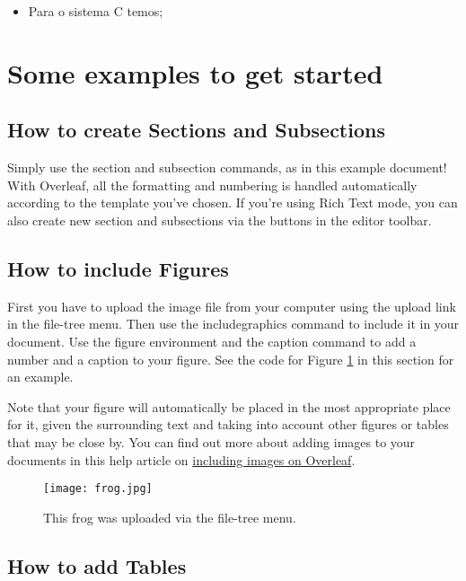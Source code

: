 \documentclass{article}
\begin{document}
      \begin{itemize}
          \item Para o sistema C temos;
      \end{itemize}
 

\section{Some examples to get started}

\subsection{How to create Sections and Subsections}

Simply use the section and subsection commands, as in this example document! With Overleaf, all the formatting and numbering is handled automatically according to the template you've chosen. If you're using Rich Text mode, you can also create new section and subsections via the buttons in the editor toolbar.

\subsection{How to include Figures}

First you have to upload the image file from your computer using the upload link in the file-tree menu. Then use the includegraphics command to include it in your document. Use the figure environment and the caption command to add a number and a caption to your figure. See the code for Figure \ref{fig:frog} in this section for an example.

Note that your figure will automatically be placed in the most appropriate place for it, given the surrounding text and taking into account other figures or tables that may be close by. You can find out more about adding images to your documents in this help article on \href{https://www.overleaf.com/learn/how-to/Including_images_on_Overleaf}{including images on Overleaf}.

\begin{figure}
\centering
\texttt{[image: frog.jpg]}
\caption{\label{fig:frog}This frog was uploaded via the file-tree menu.}
\end{figure}

\subsection{How to add Tables}
\end{document}
